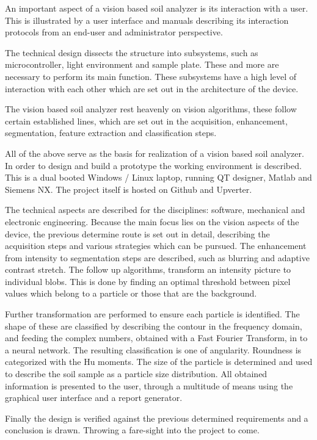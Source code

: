 \documentclass[11pt,fleqn,,a4paper,twoside,openright]{book}
\begin{document}
An important aspect of a vision based soil analyzer is its interaction with a user. This is illustrated by a user interface and manuals describing its interaction protocols from an end-user and administrator perspective.

The technical design dissects the structure into subsystems, such as microcontroller, light environment and sample plate. These and more are necessary to perform its main function. These subsystems have a high level of interaction with each other which are set out in the architecture of the device.

The vision based soil analyzer rest heavenly on vision algorithms, these follow certain established lines, which are set out in the acquisition, enhancement, segmentation, feature extraction and classification steps.

All of the above serve as the basis for realization of a vision based soil analyzer. In order to design and build a prototype the working environment is described. This is a dual booted Windows / Linux laptop, running QT designer, Matlab and Siemens NX. The project itself is hosted on Github and Upverter.

The technical aspects are described for the disciplines: software, mechanical and electronic engineering. Because the main focus lies on the vision aspects of the device, the previous determine route is set out in detail, describing the acquisition steps and various strategies which can be pursued. The enhancement from intensity to segmentation steps are described, such as blurring and adaptive contrast stretch. The follow up algorithms, transform an intensity picture to individual blobs. This is done by finding an optimal threshold between pixel values which belong to a particle or those that are the background.

Further transformation are performed to ensure each particle is identified. The shape of these are classified by describing the contour in the frequency domain, and feeding the complex numbers, obtained with a Fast Fourier Transform, in to a neural network. The resulting classification is one of angularity. Roundness is categorized with the Hu moments. The size of the particle is determined and used to describe the soil sample as a particle size distribution. All obtained information is presented to the user, through a multitude of means using the graphical user interface and a report generator.

Finally the design is verified against the previous determined requirements and a conclusion is drawn. Throwing a fare-sight into the project to come.
\end{document}
